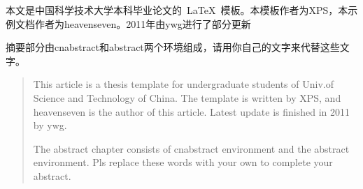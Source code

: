 
\begin{cnabstract}
    本文是中国科学技术大学本科毕业论文的~\LaTeX{}~模板。本模板作者为XPS，本示例文档作者为heavenseven。2011年由ywg进行了部分更新

    摘要部分由cnabstract和abstract两个环境组成，请用你自己的文字来代替这些文字。
\end{cnabstract}


\begin{abstract}
    This article is a thesis template for undergraduate students of Univ.of Science and Technology of China.
    The template is written by XPS, and heavenseven is the author of this article. Latest update is finished in 2011 by ywg.

    The abstract chapter consists of cnabstract environment and the abstract environment. Pls replace these words with your own to complete your abstract.
\end{abstract}
